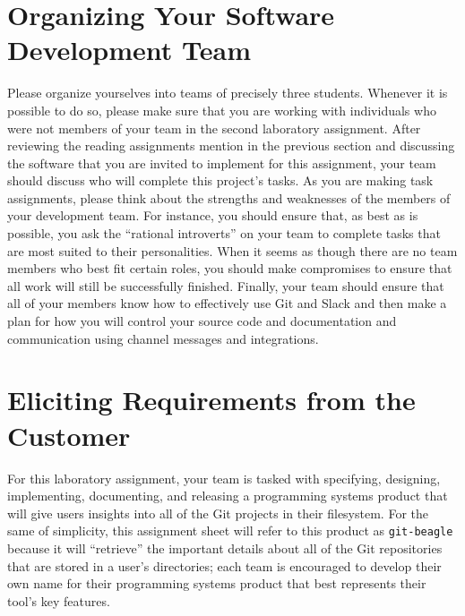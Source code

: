 \section*{Organizing Your Software Development Team}

Please organize yourselves into teams of precisely three students. Whenever it is possible to do so, please make sure that you are
working with individuals who were not members of your team in the second laboratory assignment. After reviewing the
reading assignments mention in the previous section and discussing the software that you are invited to implement for
this assignment, your team should discuss who will complete this project's tasks. As you are making task assignments,
please think about the strengths and weaknesses of the members of your development team. For instance, you should ensure
that, as best as is possible, you ask the ``rational introverts'' on your team to complete tasks that are most suited to
their personalities. When it seems as though there are no team members who best fit certain roles, you should make
compromises to ensure that all work will still be successfully finished. Finally, your team should ensure that all of
your members know how to effectively use Git and Slack and then make a plan for how you will control your source code
and documentation and communication using channel messages and integrations.

\section*{Eliciting Requirements from the Customer}

For this laboratory assignment, your team is tasked with specifying, designing, implementing, documenting, and releasing
a programming systems product that will give users insights into all of the Git projects in their filesystem. For the
same of simplicity, this assignment sheet will refer to this product as {\tt git-beagle} because it will ``retrieve''
the important details about all of the Git repositories that are stored in a user's directories; each team is encouraged
to develop their own name for their programming systems product that best represents their tool's key features.

